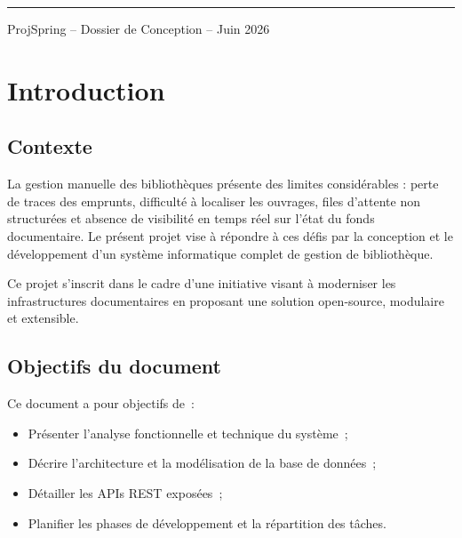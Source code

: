 \documentclass[12pt,a4paper]{article}
\begin{document}
\begin{titlepage}
\begin{center}
\vfill

{\color{navy}\rule{\linewidth}{3pt}}
\vspace{0.3cm}
{\color{navy}\small ProjSpring -- Dossier de Conception -- Juin 2026}
\end{center}
\end{titlepage}

\newpage
\tableofcontents
\newpage

\section{Introduction}

\subsection{Contexte}
La gestion manuelle des biblioth\`eques pr\'esente des limites consid\'erables : perte de traces des emprunts, difficult\'e \`a localiser les ouvrages, files d'attente non structur\'ees et absence de visibilit\'e en temps r\'eel sur l'\'etat du fonds documentaire. Le pr\'esent projet vise \`a r\'epondre \`a ces d\'efis par la conception et le d\'eveloppement d'un syst\`eme informatique complet de gestion de biblioth\`eque.

Ce projet s'inscrit dans le cadre d'une initiative visant \`a moderniser les infrastructures documentaires en proposant une solution open-source, modulaire et extensible.

\subsection{Objectifs du document}
Ce document a pour objectifs de~:
\begin{itemize}[leftmargin=1.5em, label=\textcolor{navy}{$\bullet$}]
  \item Pr\'esenter l'analyse fonctionnelle et technique du syst\`eme~;
  \item D\'ecrire l'architecture et la mod\'elisation de la base de donn\'ees~;
  \item D\'etailler les APIs REST expos\'ees~;
  \item Planifier les phases de d\'eveloppement et la r\'epartition des t\^aches.
\end{itemize}
\end{document}
